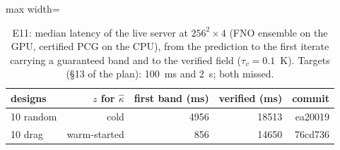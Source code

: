 \begin{table}[t]\centering\small
\begin{adjustbox}{max width=\linewidth}\begin{tabular}{lrrrr}
\hline
designs & $z$ for $\hat\kappa$ & first band (ms) & verified (ms) & commit \\
\hline
10 random & cold & 4956 & 18513 & ea20019 \\
10 drag & warm-started & 856 & 14650 & 76cd736 \\
\hline
\end{tabular}\end{adjustbox}
\caption{E11: median latency of the live server at $256^2\times4$ (FNO ensemble on the GPU, certified PCG on the CPU), from the prediction to the first iterate carrying a guaranteed band and to the verified field ($\tau_v = 0.1$~K). Targets (\S13 of the plan): 100~ms and 2~s; both missed.}
\label{tab:e11}
\end{table}
